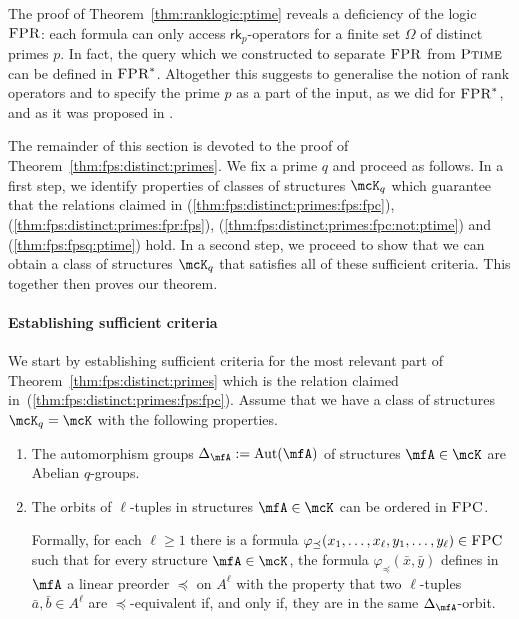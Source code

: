 \documentclass[a4paper,UKenglish]{lipics}
\newcommand{\defeq}{:=}
\newcommand{\Aut}{\ensuremath{\text{Aut}}\xspace}
\newcommand{\logic}[1]{\ensuremath{\textsc{#1}}\xspace}
\newcommand{\FPC}{\logic{FPC}}
\newcommand{\FPRK}{\logic{FPR}}
\newcommand{\FPR}{\FPRK}
\newcommand{\FPRvar}{\ensuremath{\logic{FPR}^*}\xspace}
\newcommand{\rkp}{\ensuremath{\textsf{rk}_p}\xspace}
\newcommand{\compclass}[1]{\ensuremath{\textsc{#1}}\xspace}
\newcommand{\PTIME}{\compclass{Ptime}}
\renewcommand{\phi}{\varphi}
\newcommand{\ba}{{\bar a}}
\newcommand{\bb}{{\bar b}}
\newcommand{\bx}{{\bar x}}
\newcommand{\by}{{\bar y}}
\theoremstyle{plain}
\begin{document}
The proof of Theorem~\ref{thm:ranklogic:ptime} reveals a deficiency of the 
logic \FPR: each formula can only access $\rkp$-operators for a finite 
set $\Omega$ of distinct primes $p$. In fact, the query which we constructed to 
separate $\FPR$ from $\PTIME$ can be defined in $\FPRvar$. 
Altogether this suggests to generalise the notion of rank operators 
and to specify the prime $p$ as a part of the input, as we did for $\FPRvar$, 
and as it was proposed in \cite{Ho10, La11, Pa10}. 


\medskip
The remainder of this section is devoted to the proof 
of Theorem~\ref{thm:fps:distinct:primes}.
We fix a prime $q$ and proceed as follows.
In a first step, we identify properties of classes of 
structures $\mcK_q$ which guarantee that the relations claimed in
(\ref{thm:fps:distinct:primes:fps:fpc}),
(\ref{thm:fps:distinct:primes:fpr:fps}), 
(\ref{thm:fps:distinct:primes:fpc:not:ptime}) and
(\ref{thm:fps:fpsq:ptime}) hold.
In a second step, we proceed to show that we can obtain a
class of structures $\mcK_q$ that satisfies all of these sufficient 
criteria. This together then proves our theorem.

\paragraph*{Establishing sufficient criteria}
We start by establishing sufficient criteria for the most relevant 
part of Theorem~\ref{thm:fps:distinct:primes}
which is the relation claimed in~(\ref{thm:fps:distinct:primes:fps:fpc}).
Assume that we have a class of structures $\mcK_q = 
\mcK$ with the following properties.
\begin{enumerate}[$(I)$]
 \item \label{item:property:classk:autogroups}
 The automorphism groups $\Delta_\mfA \defeq \Aut(\mfA)$ of 
structures $\mfA \in \mcK$ are Abelian $q$-groups.
 \item \label{item:property:classk:deforbits}
 The orbits of $\ell$-tuples in structures $\mfA \in \mcK$ can be ordered in 
\FPC.

Formally, for each $\ell \geq 1$ there is a formula 
$\phi_\preceq(x_1,\dots,x_\ell, y_1, \dots, y_\ell) \in \FPC$ such that for 
every structure $\mfA \in \mcK$, the formula $\phi_\preceq(\bx,\by)$ defines in 
 $\mfA$ a linear preorder $\preceq$ on $A^\ell$ with the property that two 
$\ell$-tuples $\ba, \bb \in A^\ell$ 
are $\preceq$-equivalent if, and only if, they are in the same 
$\Delta_\mfA$-orbit.
\end{enumerate}
\end{document}
